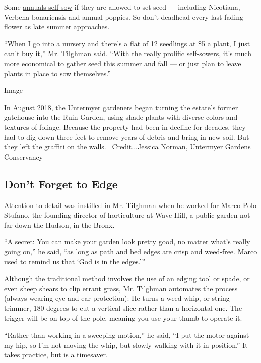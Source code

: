Some
\href{https://www.nytimes3xbfgragh.onion/2020/04/28/realestate/shopping-your-garden-plants-flowers.html?/}{annuals
self-sow} if they are allowed to set seed --- including Nicotiana,
Verbena bonariensis and annual poppies. So don't deadhead every last
fading flower as late summer approaches.

``When I go into a nursery and there's a flat of 12 seedlings at \$5 a
plant, I just can't buy it,'' Mr. Tilghman said. ``With the really
prolific self-sowers, it's much more economical to gather seed this
summer and fall --- or just plan to leave plants in place to sow
themselves.''

Image

In August 2018, the Untermyer gardeners began turning the estate's
former gatehouse into the Ruin Garden, using shade plants with diverse
colors and textures of foliage. Because the property had been in decline
for decades, they had to dig down three feet to remove years of debris
and bring in new soil. But they left the graffiti on the walls.
~Credit...Jessica Norman, Untermyer Gardens Conservancy

\hypertarget{dont-forget-to-edge}{%
\subsection{Don't Forget to Edge}\label{dont-forget-to-edge}}

Attention to detail was instilled in Mr. Tilghman when he worked for
Marco Polo Stufano, the founding director of horticulture at Wave Hill,
a public garden not far down the Hudson, in the Bronx.

``A secret: You can make your garden look pretty good, no matter what's
really going on,'' he said, ``as long as path and bed edges are crisp
and weed-free. Marco used to remind us that `God is in the edges.'''

Although the traditional method involves the use of an edging tool or
spade, or even sheep shears to clip errant grass, Mr. Tilghman automates
the process (always wearing eye and ear protection): He turns a weed
whip, or string trimmer, 180 degrees to cut a vertical slice rather than
a horizontal one. The trigger will be on top of the pole, meaning you
use your thumb to operate it.

``Rather than working in a sweeping motion,'' he said, ``I put the motor
against my hip, so I'm not moving the whip, but slowly walking with it
in position.'' It takes practice, but is a timesaver.

